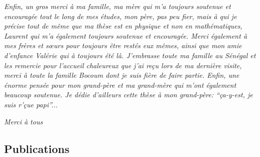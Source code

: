 \documentclass[a4paper,12pt,french]{report}
\begin{document}
\begin{center}
\textit{Enfin, un gros merci à ma famille, ma mère qui m'a toujours soutenue et encouragée tout le long de mes études, mon père, pas peu fier, mais à qui je précise tout de même que ma thèse est en physique et non en mathématiques, Laurent qui m'a également toujours soutenue et encouragée. Merci également à mes frères et sœurs pour toujours être restés eux mêmes, ainsi que mon amie d'enfance Valérie qui à toujours été là. J'embrasse toute ma famille au Sénégal et les remercie pour l'accueil chaleureux que j'ai reçu lors de ma dernière visite, merci à toute la famille Bocoum dont je suis fière de faire partie. 
 Enfin, une énorme pensée pour mon grand-père et ma grand-mère qui m'ont également beaucoup soutenue. Je dédie d'ailleurs cette thèse à mon grand-père: ``ça-y-est, je suis r'çue papi''...}
\end{center}
\thispagestyle{empty}
\begin{center}
\textit{Merci à tous}
\end{center}

 

\tableofcontents

 









\appendix                  
\listoffigures             
\listoftables              
\cleardoublepage
\newpage
\thispagestyle{empty}


%
	\begin{appendix}
		
                     \chapter{Publications}	
                    
                    
                    
                    

	
	\end{appendix}







\thispagestyle{empty}
\end{document}

